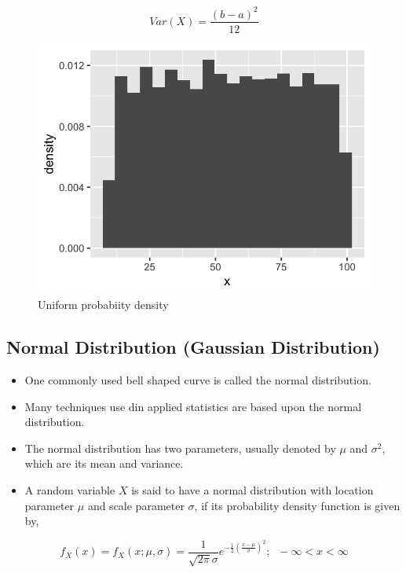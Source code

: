 \documentclass[]{book}
\begin{document}
\[Var(X) =  \frac{(b-a)^2}{12}\]

\begin{figure}

{\centering \includegraphics{figure/unif-1} 

}

\caption{Uniform probabiity density}\label{fig:unif}
\end{figure}

\hypertarget{normal-distribution-gaussian-distribution}{%
\subsection{Normal Distribution (Gaussian Distribution)}\label{normal-distribution-gaussian-distribution}}

\begin{itemize}
\item
  One commonly used bell shaped curve is called the normal distribution.
\item
  Many techniques use din applied statistics are based upon the normal distribution.
\item
  The normal distribution has two parameters, usually denoted by \(\mu\) and \(\sigma^2\), which are its mean and variance.
\item
  A random variable \(X\) is said to have a normal distribution with location parameter \(\mu\) and scale parameter \(\sigma\), if its probability density function is given by,
\end{itemize}

\[f_X(x)=f_X(x;\mu, \sigma)= \frac{1}{\sqrt{2\pi}\sigma}e^{-\frac{1}{2}\left(\frac{x-\mu}{\sigma}\right)^2};\;\; -\infty<x<\infty\]
\end{document}
